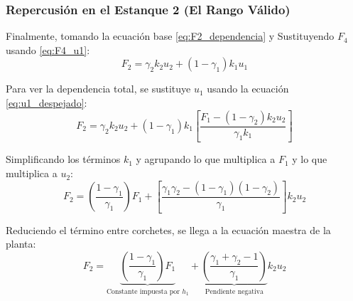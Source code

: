 \subsubsection{Repercusión en el Estanque 2 (El Rango Válido)}
Finalmente, tomando la ecuación base \eqref{eq:F2_dependencia} y Sustituyendo $F_4$ usando \eqref{eq:F4_u1}:
\begin{equation}
F_2 = \gamma_2 k_2 u_2 + (1-\gamma_1) k_1 u_1
\end{equation}

Para ver la dependencia total, se sustituye $u_1$ usando la ecuación \eqref{eq:u1_despejado}:
\begin{equation}
F_2 = \gamma_2 k_2 u_2 + (1-\gamma_1) k_1 \left[ \frac{F_1 - (1-\gamma_2) k_2 u_2}{\gamma_1 k_1} \right]
\end{equation}

Simplificando los términos $k_1$ y agrupando lo que multiplica a $F_1$ y lo que multiplica a $u_2$:
\begin{equation}
F_2 = \left( \frac{1-\gamma_1}{\gamma_1} \right) F_1 + \left[ \frac{\gamma_1 \gamma_2 - (1-\gamma_1)(1-\gamma_2)}{\gamma_1} \right] k_2 u_2
\end{equation}

Reduciendo el término entre corchetes, se llega a la ecuación maestra de la planta:
\begin{equation}
F_2 = \underbrace{\left( \frac{1-\gamma_1}{\gamma_1} \right) F_1}_{\text{Constante impuesta por } h_1} + \underbrace{\left( \frac{\gamma_1 + \gamma_2 - 1}{\gamma_1} \right)}_{\text{Pendiente negativa}} k_2 u_2
\label{eq:F2_final}
\end{equation}
\clearpage
